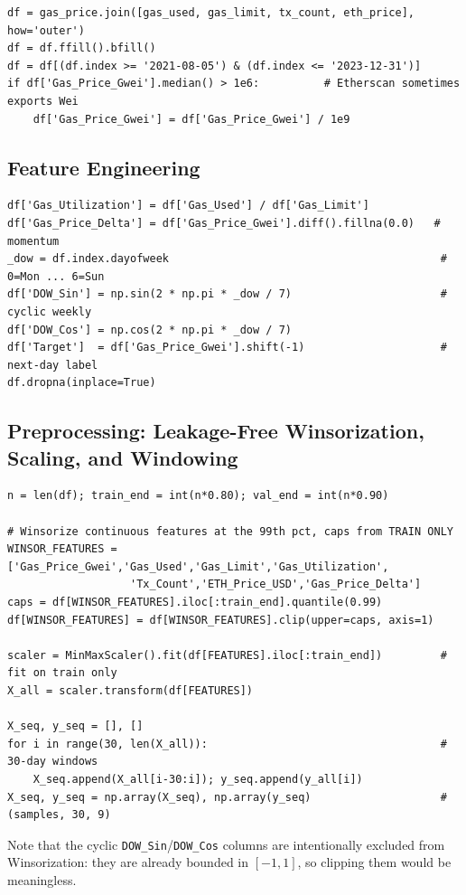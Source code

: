 \documentclass[11pt,a4paper]{article}
\begin{document}
\begin{lstlisting}[style=py,caption={Merge, gap-fill, window filter, and Wei$\to$Gwei guard.}]
df = gas_price.join([gas_used, gas_limit, tx_count, eth_price], how='outer')
df = df.ffill().bfill()
df = df[(df.index >= '2021-08-05') & (df.index <= '2023-12-31')]
if df['Gas_Price_Gwei'].median() > 1e6:          # Etherscan sometimes exports Wei
    df['Gas_Price_Gwei'] = df['Gas_Price_Gwei'] / 1e9
\end{lstlisting}

\subsection{Feature Engineering}
\begin{lstlisting}[style=py,caption={Derived, engineered, and target columns.}]
df['Gas_Utilization'] = df['Gas_Used'] / df['Gas_Limit']
df['Gas_Price_Delta'] = df['Gas_Price_Gwei'].diff().fillna(0.0)   # momentum
_dow = df.index.dayofweek                                          # 0=Mon ... 6=Sun
df['DOW_Sin'] = np.sin(2 * np.pi * _dow / 7)                       # cyclic weekly
df['DOW_Cos'] = np.cos(2 * np.pi * _dow / 7)
df['Target']  = df['Gas_Price_Gwei'].shift(-1)                     # next-day label
df.dropna(inplace=True)
\end{lstlisting}

\subsection{Preprocessing: Leakage-Free Winsorization, Scaling, and Windowing}
\begin{lstlisting}[style=py,caption={Train-only caps and scaler; 30-day sliding windows.}]
n = len(df); train_end = int(n*0.80); val_end = int(n*0.90)

# Winsorize continuous features at the 99th pct, caps from TRAIN ONLY
WINSOR_FEATURES = ['Gas_Price_Gwei','Gas_Used','Gas_Limit','Gas_Utilization',
                   'Tx_Count','ETH_Price_USD','Gas_Price_Delta']
caps = df[WINSOR_FEATURES].iloc[:train_end].quantile(0.99)
df[WINSOR_FEATURES] = df[WINSOR_FEATURES].clip(upper=caps, axis=1)

scaler = MinMaxScaler().fit(df[FEATURES].iloc[:train_end])         # fit on train only
X_all = scaler.transform(df[FEATURES])

X_seq, y_seq = [], []
for i in range(30, len(X_all)):                                    # 30-day windows
    X_seq.append(X_all[i-30:i]); y_seq.append(y_all[i])
X_seq, y_seq = np.array(X_seq), np.array(y_seq)                    # (samples, 30, 9)
\end{lstlisting}
Note that the cyclic \texttt{DOW\_Sin}/\texttt{DOW\_Cos} columns are intentionally excluded from
Winsorization: they are already bounded in $[-1,1]$, so clipping them would be meaningless.
\end{document}
